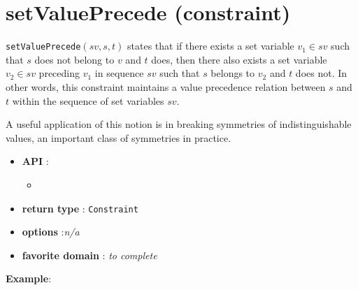 \label{setvalueprecede}
\hypertarget{setvalueprecede}{}

\section{setValuePrecede (constraint)}\label{setvalueprecede:setvalueprecedeconstraint}\hypertarget{setvalueprecede:setvalueprecedeconstraint}{}
\begin{notedef}
  \texttt{setValuePrecede}$(sv,s,t)$ states that if there exists a set variable $v_1 \in sv$ such that $s$ does not belong to $v$ and $t$ does,
  then there also exists a set variable $v_2 \in sv$ preceding $v_1$ in sequence $sv$ such that $s$ belongs to $v_2$ and $t$ does not. In other words,
  this constraint maintains a value precedence relation between $s$ and $t$ within the sequence of set variables $sv$.


  A useful application of this notion is in breaking symmetries of indistinguishable values, an important class of symmetries in practice.

\end{notedef}

\begin{itemize}
	\item \textbf{API} :
	\begin{itemize}
		\item {}
	\end{itemize}
	\item \textbf{return type} : \texttt{Constraint}
	\item \textbf{options} :\emph{n/a}
	\item \textbf{favorite domain} : \emph{to complete}
\end{itemize}

\textbf{Example}:

